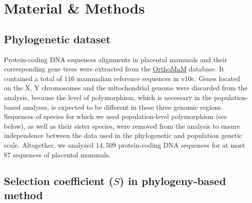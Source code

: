 \documentclass{article}
\newcommand{\Sphy}{S}
\begin{document}
    \section{Material \& Methods}
    \label{sec:methods}

    \subsection{Phylogenetic dataset}

    Protein-coding DNA sequences alignments in placental mammals and their corresponding gene trees were extracted from the \href{https://www.orthomam.univ-montp2.fr}{OrthoMaM} database.
    It contained a total of $116$ mammalian reference sequences in v10c\cite{ranwez_orthomam_2007, douzery_orthomam_2014, scornavacca_orthomam_2019}.
    Genes located on the X, Y chromosomes and the mitochondrial genome were discarded from the analysis, because the level of polymorphism, which is necessary in the population-based analyses, is expected to be different in these three genomic regions.
    Sequences of species for which we used population-level polymorphism (see below), as well as their sister species, were removed from the analysis to ensure independence between the data used in the phylogenetic and population genetic scale.
    Altogether, we analyzed $14,509$ protein-coding DNA sequences for at most $87$ sequences of placental mammals.

    \subsection{Selection coefficient ($\Sphy$) in phylogeny-based method}
    \label{subsec:s-phylogeny-method}
\end{document}
